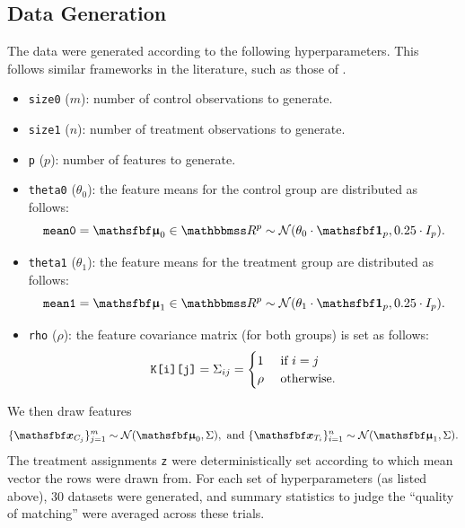 \documentclass[11pt]{extarticle}
\begin{document}
\subsection{Data Generation}

The data were generated according to the following hyperparameters. This follows similar frameworks in the literature, such as those of \textcite{austin_optimal_2011}.
\begin{itemize}
  \item \texttt{size0} ($m$): number of control observations to generate.
  \item \texttt{size1} ($n$): number of treatment observations to generate.
  \item \texttt{p} ($p$): number of features to generate.
  \item \texttt{theta0} ($\theta_0$): the feature means for the control group are distributed as follows:
    \begin{equation}
      \texttt{mean0} = \vec{\upmu}_0 \in \reals^p \sim \mathcal{N}(\theta_0 \cdot \vec{1}_p, 0.25 \cdot \mat{I}_p).
    \end{equation}
  \item \texttt{theta1} ($\theta_1$): the feature means for the treatment group are distributed as follows:
    \begin{equation}
      \texttt{mean1} = \vec{\upmu}_1 \in \reals^p \sim \mathcal{N}(\theta_1 \cdot \vec{1}_p, 0.25 \cdot \mat{I}_p).
    \end{equation}
  \item \texttt{rho} ($\rho$): the feature covariance matrix (for both groups) is set as follows:
    \begin{equation}
      \texttt{K[i][j]} = \Sigma_{i j} = \begin{cases}
        1    & \text{ if } i = j \\
        \rho & \text{ otherwise.}
      \end{cases}
      \label{eqn:dgm_K}
    \end{equation}
\end{itemize}
We then draw features
\begin{equation}
  \{ \vec{x}_{C_j} \}_{j=1}^{m} \sim \mathcal N(\vec{\upmu}_0, \mat{\Sigma}), \text{ and }
  \{ \vec{x}_{T_i} \}_{i=1}^{n} \sim \mathcal N(\vec{\upmu}_1, \mat{\Sigma}).
\end{equation}
The treatment assignments \texttt{z} were deterministically set according to which mean vector the rows were drawn from. For each set of hyperparameters (as listed above), 30 datasets were generated, and summary statistics to judge the ``quality of matching'' were averaged across these trials.
\end{document}
